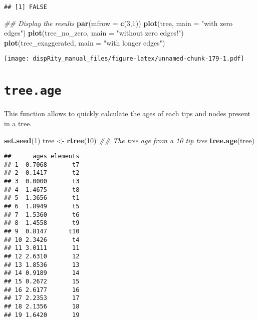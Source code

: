 \documentclass[
]{book}
\newenvironment{Shaded}{\begin{snugshade}}{\end{snugshade}}
\newcommand{\CommentTok}[1]{\textcolor[rgb]{0.56,0.35,0.01}{\textit{#1}}}
\newcommand{\DataTypeTok}[1]{\textcolor[rgb]{0.13,0.29,0.53}{#1}}
\newcommand{\DecValTok}[1]{\textcolor[rgb]{0.00,0.00,0.81}{#1}}
\newcommand{\KeywordTok}[1]{\textcolor[rgb]{0.13,0.29,0.53}{\textbf{#1}}}
\newcommand{\NormalTok}[1]{#1}
\newcommand{\StringTok}[1]{\textcolor[rgb]{0.31,0.60,0.02}{#1}}
\begin{document}
\begin{verbatim}
## [1] FALSE
\end{verbatim}

\begin{Shaded}
\begin{Highlighting}[]
\CommentTok{\#\# Display the results}
\KeywordTok{par}\NormalTok{(}\DataTypeTok{mfrow =} \KeywordTok{c}\NormalTok{(}\DecValTok{3}\NormalTok{,}\DecValTok{1}\NormalTok{))}
\KeywordTok{plot}\NormalTok{(tree, }\DataTypeTok{main =} \StringTok{"with zero edges"}\NormalTok{)}
\KeywordTok{plot}\NormalTok{(tree\_no\_zero, }\DataTypeTok{main =} \StringTok{"without zero edges!"}\NormalTok{)}
\KeywordTok{plot}\NormalTok{(tree\_exaggerated, }\DataTypeTok{main =} \StringTok{"with longer edges"}\NormalTok{)}
\end{Highlighting}
\end{Shaded}

\texttt{[image: dispRity\_manual\_files/figure-latex/unnamed-chunk-179-1.pdf]}

\hypertarget{tree.age}{%
\section{\texorpdfstring{\texttt{tree.age}}{tree.age}}\label{tree.age}}

This function allows to quickly calculate the ages of each tips and nodes present in a tree.

\begin{Shaded}
\begin{Highlighting}[]
\KeywordTok{set.seed}\NormalTok{(}\DecValTok{1}\NormalTok{)}
\NormalTok{tree \textless{}{-}}\StringTok{ }\KeywordTok{rtree}\NormalTok{(}\DecValTok{10}\NormalTok{)}
\CommentTok{\#\# The tree age from a 10 tip tree}
\KeywordTok{tree.age}\NormalTok{(tree)}
\end{Highlighting}
\end{Shaded}

\begin{verbatim}
##      ages elements
## 1  0.7068       t7
## 2  0.1417       t2
## 3  0.0000       t3
## 4  1.4675       t8
## 5  1.3656       t1
## 6  1.8949       t5
## 7  1.5360       t6
## 8  1.4558       t9
## 9  0.8147      t10
## 10 2.3426       t4
## 11 3.0111       11
## 12 2.6310       12
## 13 1.8536       13
## 14 0.9189       14
## 15 0.2672       15
## 16 2.6177       16
## 17 2.2353       17
## 18 2.1356       18
## 19 1.6420       19
\end{verbatim}
\end{document}

